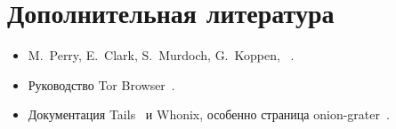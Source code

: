 \section*{Дополнительная литература}
\begin{itemize}
  \item M.~Perry, E.~Clark, S.~Murdoch, G.~Koppen, ~\cite{perry2018torbrowser}.
  \item Руководство Tor Browser~\cite{tbmanual}.
  \item Документация Tails~\cite{tailsabout} и Whonix, особенно страница onion-grater~\cite{whonixgrater}.
\end{itemize}
